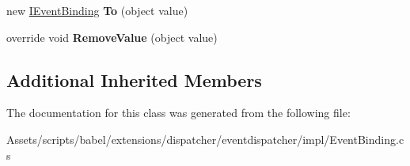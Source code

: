 \begin{DoxyCompactItemize}
\item 
\hypertarget{classbabel_1_1extensions_1_1dispatcher_1_1eventdispatcher_1_1impl_1_1_event_binding_a9e333d44a36c47923acbc9819e6d636c}{new \hyperlink{interfacebabel_1_1extensions_1_1dispatcher_1_1eventdispatcher_1_1api_1_1_i_event_binding}{I\-Event\-Binding} {\bfseries To} (object value)}\label{classbabel_1_1extensions_1_1dispatcher_1_1eventdispatcher_1_1impl_1_1_event_binding_a9e333d44a36c47923acbc9819e6d636c}

\item 
\hypertarget{classbabel_1_1extensions_1_1dispatcher_1_1eventdispatcher_1_1impl_1_1_event_binding_a13dcc230f18778bb01e740691733fa34}{override void {\bfseries Remove\-Value} (object value)}\label{classbabel_1_1extensions_1_1dispatcher_1_1eventdispatcher_1_1impl_1_1_event_binding_a13dcc230f18778bb01e740691733fa34}

\end{DoxyCompactItemize}
\subsection*{Additional Inherited Members}


The documentation for this class was generated from the following file\-:\begin{DoxyCompactItemize}
\item 
Assets/scripts/babel/extensions/dispatcher/eventdispatcher/impl/Event\-Binding.\-cs\end{DoxyCompactItemize}
